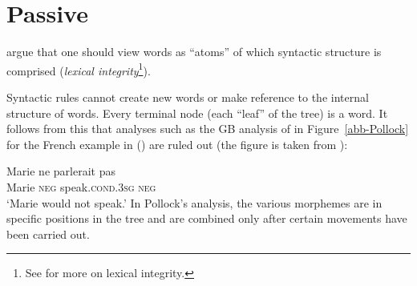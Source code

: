 \section{Passive}
\label{Abschnitt-LFG-Passiv}


\mbox{}\citet{BM95a} argue that one should view words as ``atoms'' of
which syntactic structure is comprised (\emph{lexical integrity}\footnote{%
 See  for more on lexical integrity.%
}).

Syntactic rules cannot create new words or make reference to the internal structure of words. Every terminal node (each ``leaf'' of the tree) is a word. It follows from this that
analyses such as the GB analysis of \citet{Pollock89a-u} in Figure~\vref{abb-Pollock} for the French example in ()  are ruled out (the figure is taken from
\citealp[]{Kuhn2007a}): 

\ea
\gll Marie ne parlerait pas \\
     Marie \textsc{neg} speak.\textsc{cond.3sg} \textsc{neg}\\
\glt `Marie would not speak.'
\z
%
In Pollock's analysis, the various morphemes are in specific positions in the tree and are combined only after certain movements have been carried out.

